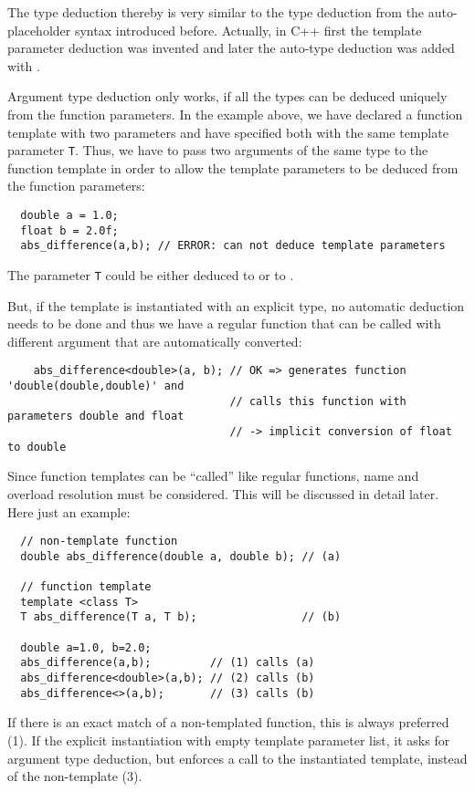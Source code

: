 The type deduction thereby is very similar to the  type deduction from the auto-placeholder syntax introduced before.
Actually, in C++ first the template parameter deduction was invented and later the auto-type deduction was added with .

\begin{rem}
  Argument type deduction only works, if all the types can be deduced uniquely from the function parameters. In the example above, we have
  declared a function template with two parameters and have specified both with the same template parameter \texttt{T}. Thus, we have to
  pass two arguments of the same type to the function template in order to allow the template parameters to be deduced from the
  function parameters:
  \begin{verbatim}
  double a = 1.0;
  float b = 2.0f;
  abs_difference(a,b); // ERROR: can not deduce template parameters
  \end{verbatim}
  The parameter \texttt{T} could be either deduced to  or to .

  But, if the template is instantiated with an explicit type, no automatic deduction needs to be done and thus we have a regular
  function that can be called with different argument that are automatically converted:
  \begin{verbatim}
    abs_difference<double>(a, b); // OK => generates function 'double(double,double)' and
                                  // calls this function with parameters double and float
                                  // -> implicit conversion of float to double
  \end{verbatim}
\end{rem}

Since function templates can be ``called'' like regular functions, name and overload resolution must be considered. This will be discussed in detail
later. Here just an example:
\begin{verbatim}
  // non-template function
  double abs_difference(double a, double b); // (a)

  // function template
  template <class T>
  T abs_difference(T a, T b);                // (b)

  double a=1.0, b=2.0;
  abs_difference(a,b);         // (1) calls (a)
  abs_difference<double>(a,b); // (2) calls (b)
  abs_difference<>(a,b);       // (3) calls (b)
\end{verbatim}
If there is an exact match of a non-templated function, this is always preferred (1). If the explicit instantiation with empty template parameter list,
it asks for argument type deduction, but enforces a call to the instantiated template, instead of the non-template (3).


